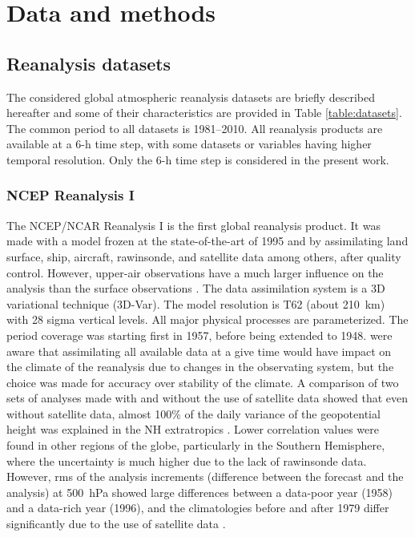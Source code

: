 \documentclass{ametsoc}
\begin{document}
\section{Data and methods}
\label{sec:data}

\subsection{Reanalysis datasets}

The considered global atmospheric reanalysis datasets are briefly described hereafter and some of their characteristics are provided in Table \ref{table:datasets}. The common period to all datasets is 1981--2010. All reanalysis products are available at a 6-h time step, with some datasets or variables having higher temporal resolution. Only the 6-h time step is considered in the present work.


\subsubsection{NCEP Reanalysis I}

The NCEP/NCAR Reanalysis I \citep[NR-1,][]{Kalnay1996, Kistler2001} is the first global reanalysis product. It was made with a model frozen at the state-of-the-art of 1995 and by assimilating land surface, ship, aircraft, rawinsonde, and satellite data among others, after quality control. However, upper-air observations have a much larger influence on the analysis than the surface observations \citep{Kistler2001}. The data assimilation system is a 3D variational technique (3D-Var). The model resolution is T62 (about 210~km) with 28 sigma vertical levels. All major physical processes are parameterized. The period coverage was starting first in 1957, before being extended to 1948. \citet{Kalnay1996} were aware that assimilating all available data at a give time would have impact on the climate of the reanalysis due to changes in the observating system, but the choice was made for accuracy over stability of the climate. A comparison of two sets of analyses made with and without the use of satellite data showed that even without satellite data, almost 100\% of the daily variance of the geopotential height was explained in the NH extratropics \citep{Kalnay1996}. Lower correlation values were found in other regions of the globe, particularly in the Southern Hemisphere, where the uncertainty is much higher due to the lack of rawinsonde data. However, rms of the analysis increments (difference between the forecast and the analysis) at 500~hPa showed large differences between a data-poor year (1958) and a data-rich year (1996), and the climatologies before and after 1979 differ significantly due to the use of satellite data \citep{Kistler2001}.
\end{document}
